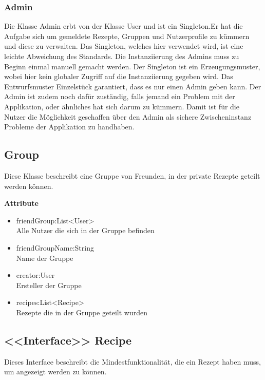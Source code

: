 \subsubsection{Admin}
Die Klasse Admin erbt von der Klasse User und ist ein Singleton.Er hat die Aufgabe sich um gemeldete Rezepte, Gruppen und Nutzerprofile zu kümmern und diese zu verwalten. Das Singleton, welches hier verwendet wird, ist eine leichte Abweichung des Standards. Die Instanziierung des Admins muss zu Beginn einmal manuell gemacht werden. Der Singleton ist ein Erzeugungsmuster, wobei hier kein globaler Zugriff auf die Instanziierung gegeben wird.  Das Entwurfsmuster Einzelstück garantiert, dass es nur einen Admin geben kann.  Der Admin ist zudem noch dafür zuständig, falls jemand ein Problem mit der Applikation, oder ähnliches hat sich darum zu kümmern. Damit ist für die Nutzer die Möglichkeit geschaffen über den Admin als sichere Zwischeninstanz Probleme der Applikation zu handhaben.

\subsection{Group}
Diese Klasse beschreibt eine Gruppe von Freunden, in der private Rezepte geteilt werden können.

\textbf{Attribute}
\begin{itemize}[nosep]
	\item friendGroup:List<User> \\ Alle Nutzer die sich in der Gruppe befinden
	\item friendGroupName:String \\ Name der Gruppe
	\item creator:User \\ Ersteller der Gruppe
	\item recipes:List<Recipe> \\ Rezepte die in der Gruppe geteilt wurden
\end{itemize}

\subsection{<<Interface>> Recipe}
Dieses Interface beschreibt die Mindestfunktionalität, die ein Rezept haben muss, um angezeigt werden zu können.

